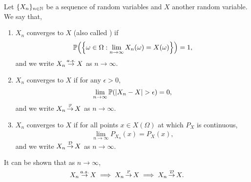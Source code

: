 \begin{defn}\label{def:rv_convergence}
  Let $\{X_n\}_{n\in\mathbb{N}}$ be a sequence of random variables and $X$ another random variable. We say that, \begin{enumerate}
    \item $X_n$ converges to $X$  (also called ) if \begin{align}
      \Pr{\braces*{\omega \in \Omega : \lim_{n\to\infty} X_n(\omega) = X(\omega)}} = 1, \label{eq:as_convergence}
    \end{align} and we write $X_n \operatorname*{\smash{\overset{a.s.}{\rightarrow}}} X$ as $n\to\infty$.

    \item $X_n$ converges to $X$  if for any $\epsilon > 0$, \begin{align}
      \lim_{n\to\infty} \Pr{\abs{X_n - X} > \epsilon} = 0, \label{eq:p_convergence}
    \end{align} and we write $X_n \operatorname*{\smash{\overset{\mathbb{P}}{\rightarrow}}} X$ as $n\to\infty$.

    \item $X_n$ converges to $X$  if for all points $x \in X(\Omega)$ at which $P_X$ is continuous, \begin{align}
      \lim_{n\to\infty} P_{X_n}(x) = P_X(x), \label{eq:d_convergence}
    \end{align} and we write $X_n \operatorname*{\smash{\overset{\mathcal{D}}{\rightarrow}}} X$ as $n\to\infty$.
  \end{enumerate}

  It can be shown that as $n\to\infty$, \begin{align}
    X_n \operatorname*{\smash{\overset{a.s.}{\rightarrow}}} X \implies X_n \operatorname*{\smash{\overset{\mathbb{P}}{\rightarrow}}} X \implies X_n \operatorname*{\smash{\overset{\mathcal{D}}{\rightarrow}}} X.
  \end{align}
\end{defn}

